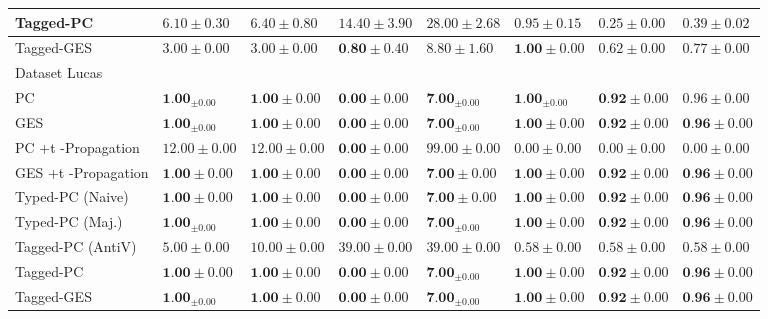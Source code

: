 \documentclass[10pt]{article}
\begin{document}
\begin{center}
\begin{tabular}{|l|l|l|l|l|l|l|l|}
Tagged-PC & $6.10 \pm 0.30$ & $6.40 \pm 0.80$ & $14.40 \pm 3.90$ & $28.00 \pm 2.68$ & $0.95 \pm 0.15$ & $0.25 \pm 0.00$ & $0.39 \pm 0.02$ \\
\hline
Tagged-GES & $3.00 \pm 0.00$ & $3.00 \pm 0.00$ & $\mathbf{0 . 8 0} \pm 0.40$ & $8.80 \pm 1.60$ & $\mathbf{1 . 0 0} \pm 0.00$ & $0.62 \pm 0.00$ & $0.77 \pm 0.00$ \\
\hline
Dataset Lucas & \multicolumn{7}{|c|}{} \\
\hline
PC & $\mathbf{1 . 0 0}_{ \pm 0.00}$ & $\mathbf{1 . 0 0} \pm 0.00$ & $\mathbf{0 . 0 0} \pm 0.00$ & $\mathbf{7 . 0 0}_{ \pm 0.00}$ & $\mathbf{1 . 0 0}_{ \pm 0.00}$ & $\mathbf{0 . 9 2} \pm 0.00$ & $0.96 \pm 0.00$ \\
\hline
GES & $\mathbf{1 . 0 0}_{ \pm 0.00}$ & $\mathbf{1 . 0 0} \pm 0.00$ & $\mathbf{0 . 0 0} \pm 0.00$ & $\mathbf{7 . 0 0}_{ \pm 0.00}$ & $\mathbf{1 . 0 0} \pm 0.00$ & $\mathbf{0 . 9 2} \pm 0.00$ & $\mathbf{0 . 9 6} \pm 0.00$ \\
\hline
PC +t -Propagation & $12.00 \pm 0.00$ & $12.00 \pm 0.00$ & $\mathbf{0 . 0 0} \pm 0.00$ & $99.00 \pm 0.00$ & $0.00 \pm 0.00$ & $0.00 \pm 0.00$ & $0.00 \pm 0.00$ \\
\hline
GES +t -Propagation & $\mathbf{1 . 0 0} \pm 0.00$ & $\mathbf{1 . 0 0} \pm 0.00$ & $\mathbf{0 . 0 0} \pm 0.00$ & $\mathbf{7 . 0 0} \pm 0.00$ & $\mathbf{1 . 0 0} \pm 0.00$ & $\mathbf{0 . 9 2} \pm 0.00$ & $\mathbf{0 . 9 6} \pm 0.00$ \\
\hline
Typed-PC (Naive) & $\mathbf{1 . 0 0} \pm 0.00$ & $\mathbf{1 . 0 0} \pm 0.00$ & $\mathbf{0 . 0 0} \pm 0.00$ & $\mathbf{7 . 0 0} \pm 0.00$ & $\mathbf{1 . 0 0} \pm 0.00$ & $\mathbf{0 . 9 2} \pm 0.00$ & $\mathbf{0 . 9 6} \pm 0.00$ \\
\hline
Typed-PC (Maj.) & $\mathbf{1 . 0 0}_{ \pm 0.00}$ & $\mathbf{1 . 0 0} \pm 0.00$ & $\mathbf{0 . 0 0} \pm 0.00$ & $\mathbf{7 . 0 0}_{ \pm 0.00}$ & $\mathbf{1 . 0 0} \pm 0.00$ & $\mathbf{0 . 9 2} \pm 0.00$ & $\mathbf{0 . 9 6} \pm 0.00$ \\
\hline
Tagged-PC (AntiV) & $5.00 \pm 0.00$ & $10.00 \pm 0.00$ & $39.00 \pm 0.00$ & $39.00 \pm 0.00$ & $0.58 \pm 0.00$ & $0.58 \pm 0.00$ & $0.58 \pm 0.00$ \\
\hline
Tagged-PC & $\mathbf{1 . 0 0} \pm 0.00$ & $\mathbf{1 . 0 0} \pm 0.00$ & $\mathbf{0 . 0 0} \pm 0.00$ & $\mathbf{7 . 0 0}_{ \pm 0.00}$ & $\mathbf{1 . 0 0} \pm 0.00$ & $\mathbf{0 . 9 2} \pm 0.00$ & $\mathbf{0 . 9 6} \pm 0.00$ \\
\hline
Tagged-GES & $\mathbf{1 . 0 0}_{ \pm 0.00}$ & $\mathbf{1 . 0 0} \pm 0.00$ & $\mathbf{0 . 0 0} \pm 0.00$ & $\mathbf{7 . 0 0}_{ \pm 0.00}$ & $\mathbf{1 . 0 0} \pm 0.00$ & $\mathbf{0 . 9 2} \pm 0.00$ & $\mathbf{0 . 9 6} \pm 0.00$ \\
\hline
\end{tabular}
\end{center}
\end{document}

